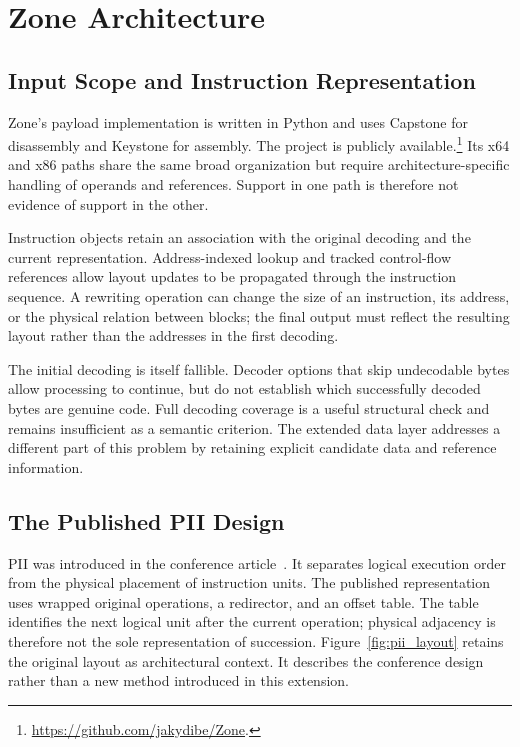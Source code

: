 \section{Zone Architecture}\label{sec:architecture}
\subsection{Input Scope and Instruction Representation}
Zone's payload implementation is written in Python and uses Capstone
for disassembly and Keystone for assembly. The project is publicly
available.\footnote{\url{https://github.com/jakydibe/Zone}.}
Its x64 and x86 paths share the same broad organization but require
architecture-specific handling of operands and references. Support in
one path is therefore not evidence of support in the other.

Instruction objects retain an association with the original decoding
and the current representation. Address-indexed lookup and tracked
control-flow references allow layout updates to be propagated through
the instruction sequence. A rewriting operation can change the size of
an instruction, its address, or the physical relation between blocks;
the final output must reflect the resulting layout rather than the
addresses in the first decoding.

The initial decoding is itself fallible. Decoder options that skip
undecodable bytes allow processing to continue, but do not establish
which successfully decoded bytes are genuine code. Full decoding
coverage is a useful structural check and remains insufficient as a
semantic criterion. The extended data layer addresses a different part
of this problem by retaining explicit candidate data and reference
information.

\subsection{The Published PII Design}\label{sec:pii}
PII was introduced in the conference article~\cite{zone_secrypt_2026}.
It separates logical execution order from the physical placement of
instruction units. The published representation uses wrapped original
operations, a redirector, and an offset table. The table identifies the
next logical unit after the current operation; physical adjacency is
therefore not the sole representation of succession.
Figure~\ref{fig:pii_layout} retains the original layout as architectural
context. It describes the conference design rather than a new method
introduced in this extension.


